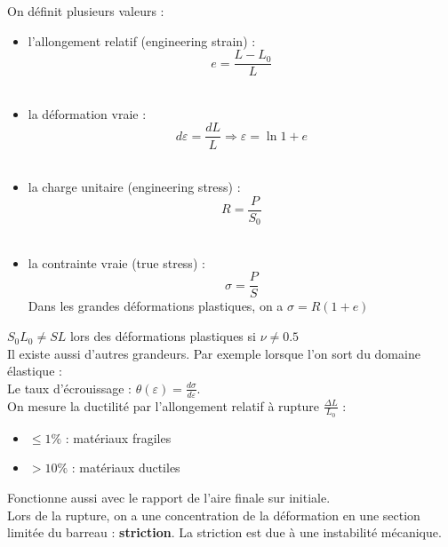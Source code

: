 \documentclass[../main.tex]{subfiles}
\begin{document}
On définit plusieurs valeurs : \\
\begin{itemize}
    \item l'allongement relatif (engineering strain) : \begin{equation}
        e= \frac{L-L_0}{L}
    \end{equation}\\
    \item la déformation vraie : \begin{equation}
        d\varepsilon = \frac{dL}{L} \Rightarrow \varepsilon = \ln{1+e}
    \end{equation}\\
    \item la charge unitaire (engineering stress) : \begin{equation}
        R = \frac{P}{S_0}
    \end{equation}\\
    \item la contrainte vraie (true stress) : \begin{equation}
        \sigma = \frac{P}{S}
    \end{equation} Dans les grandes déformations plastiques, on a $\sigma = R(1+e)$\\
    
\end{itemize}
\warning $S_0L_0 \neq SL$ lors des déformations plastiques si $\nu \neq 0.5$\\

Il existe aussi d'autres grandeurs. Par exemple lorsque l'on sort du domaine élastique : \\
Le taux d'écrouissage : $\theta(\varepsilon) = \frac{d\sigma}{d\varepsilon}$.\\
On mesure la ductilité par l'allongement relatif à rupture $\frac{\Delta L}{L_0}$ : \\
\begin{itemize}
    \item $\leq 1\%$ : matériaux fragiles\\
    \item $> 10 \%$ : matériaux ductiles\\
\end{itemize}
Fonctionne aussi avec le rapport de l'aire finale sur initiale.\\

Lors de la rupture, on a une concentration de la déformation en une section limitée du barreau : \textbf{striction}. La striction est due à une instabilité mécanique.\\
\end{document}

